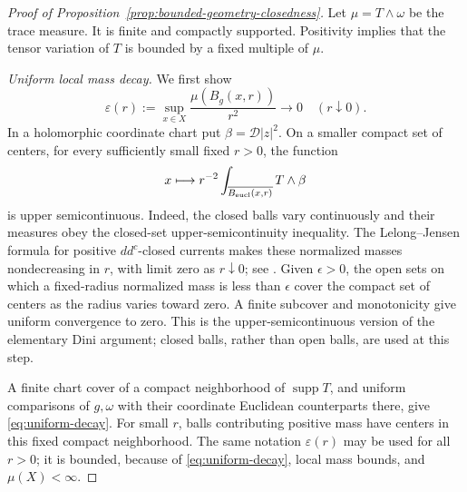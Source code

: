 \documentclass[11pt]{article}
\theoremstyle{remark}
\newcommand{\D}{\mathcal D}
\newcommand{\supp}{\operatorname{supp}}
\begin{document}
\begin{proof}[Proof of Proposition~\ref{prop:bounded-geometry-closedness}]
Let $\mu=T\wedge\omega$ be the trace measure. It is finite and
compactly supported. Positivity implies that the tensor variation
of $T$ is bounded by a fixed multiple of $\mu$.

\medskip\noindent
\emph{Uniform local mass decay.}
We first show
\begin{equation}\label{eq:uniform-decay}
 \varepsilon(r):=\sup_{x\in X}\frac{\mu(B_g(x,r))}{r^2}
       \longrightarrow0\quad(r\downarrow0).
\end{equation}
In a holomorphic coordinate chart put $\beta=\D|z|^2$. On a smaller
compact set of centers, for every sufficiently small fixed $r>0$,
the function
\[
 x\longmapsto r^{-2}
       \int_{\overline{B_{\rm eucl}(x,r)}}T\wedge\beta
\]
is upper semicontinuous. Indeed, the closed balls vary continuously
and their measures obey the closed-set upper-semicontinuity
inequality. The Lelong--Jensen formula for positive $dd^c$-closed
currents makes these normalized masses nondecreasing in $r$, with
limit zero as $r\downarrow0$; see
\cite[Appendix~B, (B.1)--(B.2)]{DNS}.
Given $\epsilon>0$, the open sets on which a fixed-radius normalized
mass is less than $\epsilon$ cover the compact set of centers as the
radius varies toward zero. A finite subcover and monotonicity give
uniform convergence to zero. This is the upper-semicontinuous
version of the elementary Dini argument; closed balls, rather than
open balls, are used at this step.

A finite chart cover of a compact neighborhood of $\supp T$, and
uniform comparisons of $g,\omega$ with their coordinate Euclidean
counterparts there, give \eqref{eq:uniform-decay}. For small $r$,
balls contributing positive mass have centers in this fixed compact
neighborhood. The same notation $\varepsilon(r)$ may be used for
all $r>0$; it is bounded, because of \eqref{eq:uniform-decay}, local
mass bounds, and $\mu(X)<\infty$.


\end{proof}
\end{document}
